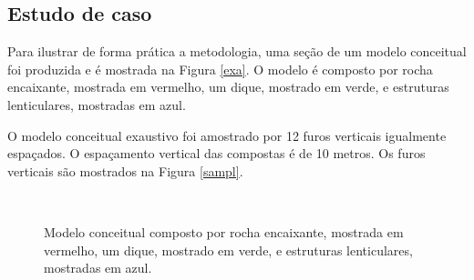 \subsection{Estudo de caso}

Para ilustrar de forma prática a metodologia, uma seção de um modelo conceitual foi produzida e é mostrada na Figura \autoref{exa}. O modelo é composto por rocha encaixante, mostrada em vermelho, um dique, mostrado em verde, e estruturas lenticulares, mostradas em azul.

O modelo conceitual exaustivo foi amostrado por 12 furos verticais igualmente espaçados. O espaçamento vertical das compostas é de 10 metros. Os furos verticais são mostrados na Figura \autoref{sampl}. 

\begin{figure}[H] 
    \centering
    \caption{Modelo conceitual composto por rocha encaixante, mostrada em vermelho, um dique, mostrado em verde, e estruturas lenticulares, mostradas em azul.} \label{concep_exhaust}
     \\
\end{figure}

